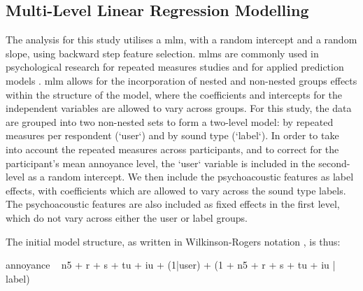  \subsection{Multi-Level Linear Regression Modelling}

   The analysis for this study utilises a \gls{mlm}, with a random intercept and a random slope, using backward step feature selection. \gls{mlm}s are commonly used in psychological research for repeated measures studies  and for applied prediction models . \gls{mlm} allows for the incorporation of nested and non-nested groups effects within the structure of the model, where the coefficients and intercepts for the independent variables are allowed to vary across groups. For this study, the data are grouped into two non-nested sets to form a two-level model: by repeated measures per respondent (`user`) and by sound type (`label`). In order to take into account the repeated measures across participants, and to correct for the participant's mean annoyance level, the `user` variable is included in the second-level as a random intercept. We then include the psychoacoustic features as label effects, with coefficients which are allowed to vary across the sound type labels. The psychoacoustic features are also included as fixed effects in the first level, which do not vary across either the user or label groups.

   The initial model structure, as written in Wilkinson-Rogers notation , is thus:

   annoyance ~ \gls{n5} + \gls{r} + \gls{s} + \gls{tu} + \gls{iu} + (1|user) + (1 + \gls{n5} + \gls{r} + \gls{s} + \gls{tu} + \gls{iu} | label)

